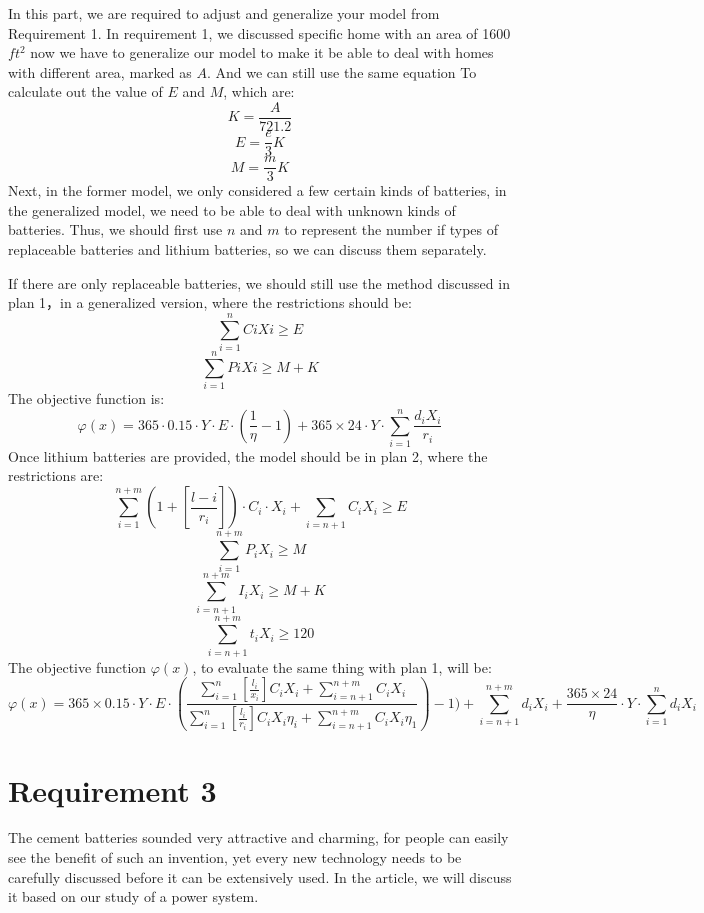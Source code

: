 \documentclass{article}
\begin{document}
In this part, we are required to adjust and generalize your model from Requirement 1.
In requirement 1, we discussed specific home with an area of 1600$ft^2$ now we have to generalize our  model to make it be able to deal with homes with different area, marked as $A$. And we can still use the same equation To
calculate out the value of $E$ and $M$, which are:$$K=\frac{A}{721.2}$$ $$E=\frac{e}{3}K$$  $$M=\frac{m}{3}K$$
Next, in the former model, we only considered a few certain kinds of batteries, in the generalized model, we need to be able to deal with unknown kinds of batteries. Thus, we should first use $n$ and $m$ to represent the
number if types of replaceable batteries and lithium batteries, so we can discuss them separately.\par
If there are only replaceable batteries, we should still use the method discussed in plan 1，in a generalized version, where the restrictions should be:
$$\sum_{i=1}^nCiXi\geq E$$
$$\sum_{i=1}^nPiXi\geq M+K$$
The objective function is:
$$\varphi (x)=365 \cdot 0.15 \cdot Y \cdot E \cdot (\frac{1}{\eta }-1) +365\times 24\cdot Y \cdot \sum_{i=1} ^n\frac{d_iX_i}{r_i}$$
Once lithium batteries are provided, the model should be in plan 2, where the restrictions are:
$$\sum_{i=1}^{n+m}(1+[\frac{l-i}{r_i}]) \cdot C_i \cdot X_i + \sum_{i=n+1}C_iX_i\geq E$$
$$\sum_{i=1}^{n+m}P_iX_i\geq M$$
$$\sum_{i=n+1}^{n+m}I_iX_i\geq M+K$$
$$\sum_{i=n+1}^{n+m} t_iX_i\geq 120$$
The objective function $\varphi (x)$, to evaluate the same thing with plan 1,  will be:
$$\varphi (x) = 365 \times 0.15 \cdot Y \cdot E \cdot (\frac{\sum^n_{i=1}[\frac{l_i}{x_i}]C_iX_i+\sum_{i=n+1}^{n+m}C_iX_i}{\sum^n_{i=1}[\frac{l_i}{r_i}]C_iX_i\eta _i+\sum_{i=n+1}^{n+m}C_iX_i\eta _1})-1)
    + \sum_{i=n+1} ^{n+m}d_iX_i+\frac{365 \times 24}{\eta } \cdot Y \cdot \sum_{i=1} ^{n}d_iX_i $$
\section{Requirement 3}
The cement batteries sounded very attractive and charming, for people can easily see the benefit of such an invention, yet every new technology needs to be carefully discussed  before it can be extensively used. In the article,
we will discuss it based on our study of a power system.
\end{document}
